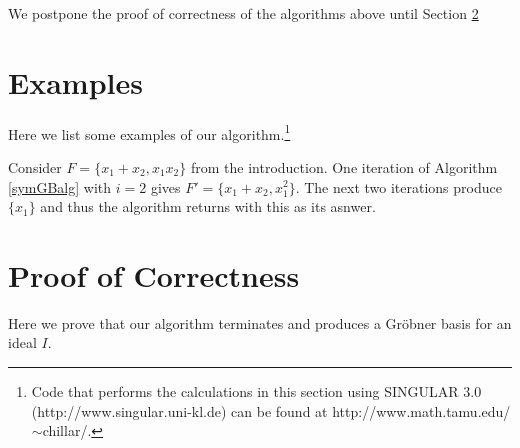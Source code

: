 \documentclass{amsart}
\theoremstyle{definition}
\theoremstyle{remark}
\numberwithin{equation}{section}
\newcommand{\<}{\langle}
\renewcommand{\>}{\rangle}
\begin{document}
We postpone the proof of correctness of the algorithms above until Section \ref{proofcorrect}

\section{Examples}\label{algexamples}

Here we list some examples of our algorithm.\footnote{Code that performs the calculations in this section using SINGULAR 3.0 (http://www.singular.uni-kl.de) can be found at http://www.math.tamu.edu/$\sim$chillar/.}

Consider $F = \{x_1+x_2, x_1 x_2\}$ from the introduction.  One iteration of 
Algorithm \ref{symGBalg} with $i = 2$ gives $F' = \{x_1+x_2, x_1^2\}$.
The next two iterations produce $\{x_1\}$ and thus the algorithm returns with this 
as its asnwer. 

\section{Proof of Correctness}\label{proofcorrect}

Here we prove that our algorithm terminates and 
produces a Gr\"obner basis for an ideal $I$.
\end{document}
